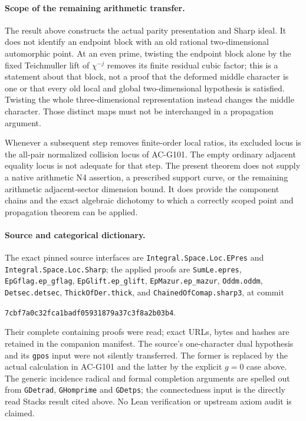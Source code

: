 \paragraph{Scope of the remaining arithmetic transfer.}
The result above constructs the actual parity presentation
and Sharp ideal.  It does not identify an endpoint block
with an old rational two-dimensional automorphic point.
At an even prime, twisting the endpoint block alone by
the fixed Teichmuller lift of \(\chi^{-j}\) removes its
finite residual cubic factor; this is a statement about
that block, not a proof that the deformed middle
character is one or that every old local and global
two-dimensional hypothesis is satisfied.  Twisting
the whole three-dimensional representation instead
changes the middle character.  Those distinct maps
must not be interchanged in a propagation argument.

Whenever a subsequent step removes finite-order local
ratios, its excluded locus is the all-pair normalized
collision locus of AC-G101.  The empty ordinary
adjacent equality locus is not adequate for that step.
The present theorem does not supply a native arithmetic
N4 assertion, a prescribed support curve, or the
remaining arithmetic adjacent-sector dimension bound.
It does provide the component chains and the exact
algebraic dichotomy to which a correctly scoped point
and propagation theorem can be applied.

\paragraph{Source and categorical dictionary.}
The exact pinned source interfaces are
\texttt{Integral.Space.Loc.EPres} and
\texttt{Integral.Space.Loc.Sharp}; the applied proofs
are \texttt{SumLe.epres}, \texttt{EpGflag.ep\_gflag},
\texttt{EpGlift.ep\_glift}, \texttt{EpMazur.ep\_mazur},
\texttt{Oddm.oddm}, \texttt{Detsec.detsec},
\texttt{ThickOfDer.thick}, and
\texttt{ChainedOfComap.sharp3}, at commit
\begin{center}
\texttt{7cbf7a0c32fca1badf05931879a37c3f8a2b03b4}.
\end{center}
Their complete containing proofs were read; exact URLs,
bytes and hashes are retained in the companion manifest.
The source's one-character dual hypothesis and its
\texttt{gpos} input were not silently transferred.
The former is replaced by the actual calculation in
AC-G101 and the latter by the explicit \(g=0\) case above.
The generic incidence radical and formal completion
arguments are spelled out from \texttt{GDetrad},
\texttt{GHomprime} and \texttt{GDetps}; the connectedness
input is the directly read Stacks result cited above.
No Lean verification or upstream axiom audit is claimed.


